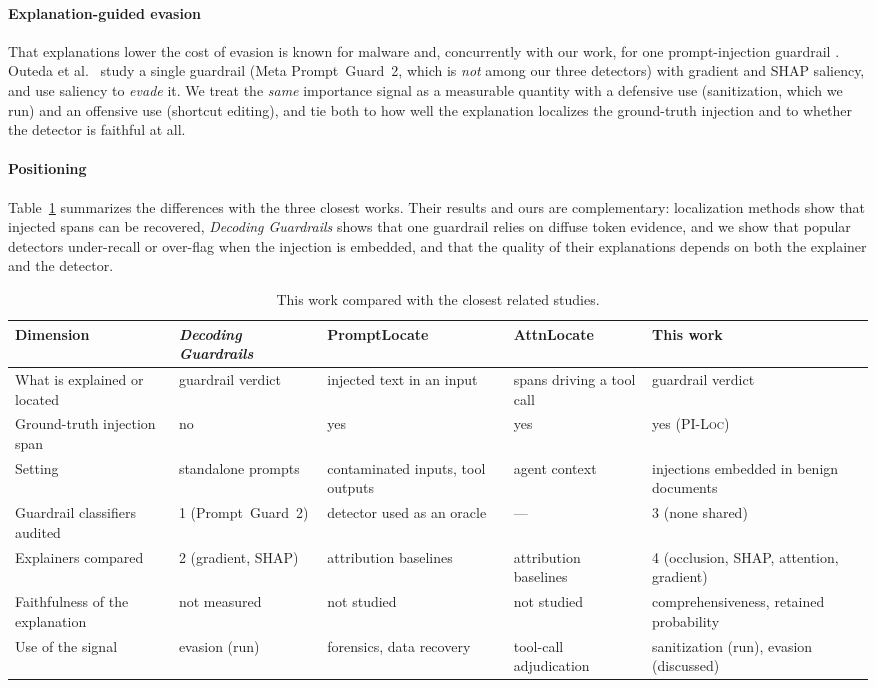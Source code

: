 \documentclass{ieeeaccess}
\begin{document}
\paragraph*{Explanation-guided evasion}
That explanations lower the cost of evasion is known for malware \cite{warnecke2020} and, concurrently with our work, for one prompt-injection guardrail \cite{decodingguardrails}. Outeda et al.\ \cite{decodingguardrails} study a single guardrail (Meta Prompt~Guard~2, which is \emph{not} among our three detectors) with gradient and SHAP saliency, and use saliency to \emph{evade} it. We treat the \emph{same} importance signal as a measurable quantity with a defensive use (sanitization, which we run) and an offensive use (shortcut editing), and tie both to how well the explanation localizes the ground-truth injection and to whether the detector is faithful at all.

\paragraph*{Positioning}
Table~\ref{tab:compare} summarizes the differences with the three closest works. Their results and ours are complementary: localization methods show that injected spans can be recovered, \emph{Decoding Guardrails} shows that one guardrail relies on diffuse token evidence, and we show that popular detectors under-recall or over-flag when the injection is embedded, and that the quality of their explanations depends on both the explainer and the detector.

\begin{table}[t]
\centering
\caption{This work compared with the closest related studies.}
\label{tab:compare}
\setlength{\tabcolsep}{4pt}
\begin{tabular}{@{}p{3.1cm}p{3.1cm}p{3.1cm}p{3.1cm}p{3.6cm}@{}}
\toprule
Dimension & \emph{Decoding Guardrails} \cite{decodingguardrails} & PromptLocate \cite{promptlocate2026} & AttnLocate \cite{attnlocate2026} & This work\\
\midrule
What is explained or located & guardrail verdict & injected text in an input & spans driving a tool call & guardrail verdict\\
Ground-truth injection span & no & yes & yes & yes (\textsc{PI-Loc})\\
Setting & standalone prompts & contaminated inputs, tool outputs & agent context & injections embedded in benign documents\\
Guardrail classifiers audited & 1 (Prompt~Guard~2) & detector used as an oracle & --- & 3 (none shared)\\
Explainers compared & 2 (gradient, SHAP) & attribution baselines & attribution baselines & 4 (occlusion, SHAP, attention, gradient)\\
Faithfulness of the explanation & not measured & not studied & not studied & comprehensiveness, retained probability\\
Use of the signal & evasion (run) & forensics, data recovery & tool-call adjudication & sanitization (run), evasion (discussed)\\
\bottomrule
\end{tabular}
\end{table}
\end{document}
